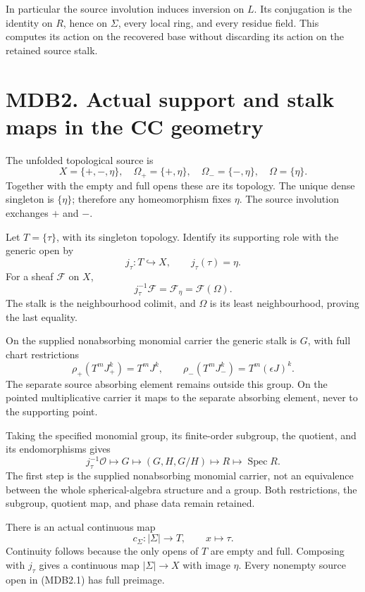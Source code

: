 \documentclass[
]{report}
\newcounter{none} %
\begin{document}
In particular the source involution induces inversion on \(L\). Its
conjugation is the identity on \(R\), hence on \(\Sigma\), every local
ring, and every residue field. This computes its action on the recovered
base without discarding its action on the retained source stalk.

\section{MDB2. Actual support and stalk maps in the CC
geometry}\label{mdb2.-actual-support-and-stalk-maps-in-the-cc-geometry}

The unfolded topological source is \[
X=\{+,-,\eta\},\quad
\Omega_+=\{+,\eta\},\quad
\Omega_-=\{-,\eta\},\quad \Omega=\{\eta\}.
\tag{MDB2.1}
\] Together with the empty and full opens these are its topology. The
unique dense singleton is \(\{\eta\}\); therefore any homeomorphism
fixes \(\eta\). The source involution exchanges \(+\) and \(-\).

Let \(T=\{\tau\}\), with its singleton topology. Identify its supporting
role with the generic open by \[
j_\tau:T\hookrightarrow X,\qquad j_\tau(\tau)=\eta.
\tag{MDB2.2}
\] For a sheaf \(\mathcal F\) on \(X\), \[
j_\tau^{-1}\mathcal F=\mathcal F_\eta=\mathcal F(\Omega).
\tag{MDB2.3}
\] The stalk is the neighbourhood colimit, and \(\Omega\) is its least
neighbourhood, proving the last equality.

On the supplied nonabsorbing monomial carrier the generic stalk is
\(G\), with full chart restrictions \[
\rho_+(T^mJ_+^k)=T^mJ^k,\qquad
\rho_-(T^mJ_-^k)=T^m(\epsilon J)^k.
\tag{MDB2.4}
\] The separate source absorbing element remains outside this group. On
the pointed multiplicative carrier it maps to the separate absorbing
element, never to the supporting point.

Taking the specified monomial group, its finite-order subgroup, the
quotient, and its endomorphisms gives \[
j_\tau^{-1}\mathcal O\longmapsto
G\longmapsto(G,H,G/H)\longmapsto R\longmapsto\operatorname{Spec}R.
\tag{MDB2.5}
\] The first step is the supplied nonabsorbing monomial carrier, not an
equivalence between the whole spherical-algebra structure and a group.
Both restrictions, the subgroup, quotient map, and phase data remain
retained.

There is an actual continuous map \[
c_\Sigma:|\Sigma|\to T,\qquad x\mapsto\tau.
\tag{MDB2.6}
\] Continuity follows because the only opens of \(T\) are empty and
full. Composing with \(j_\tau\) gives a continuous map \(|\Sigma|\to X\)
with image \(\eta\). Every nonempty source open in (MDB2.1) has full
preimage.
\end{document}

